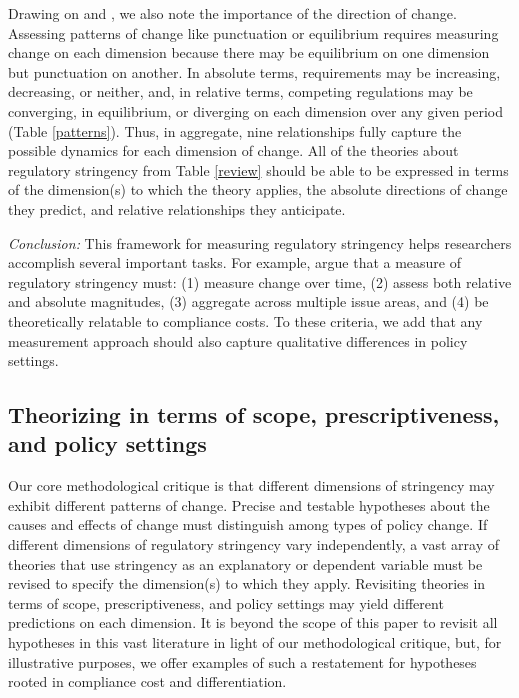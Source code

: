 \documentclass[
      12pt,
            Review ]{article}
\begin{document}
Drawing on \citet{Baumgartner2002} and \citet{Howlett2007}, we also note
the importance of the direction of change. Assessing patterns of change
like punctuation or equilibrium requires measuring change on each
dimension because there may be equilibrium on one dimension but
punctuation on another. In absolute terms, requirements may be
increasing, decreasing, or neither, and, in relative terms, competing
regulations may be converging, in equilibrium, or diverging on each
dimension over any given period (Table \ref{patterns}). Thus, in
aggregate, nine relationships fully capture the possible dynamics for
each dimension of change. All of the theories about regulatory
stringency from Table \ref{review} should be able to be expressed in
terms of the dimension(s) to which the theory applies, the absolute
directions of change they predict, and relative relationships they
anticipate.



\emph{Conclusion:} This framework for measuring regulatory stringency
helps researchers accomplish several important tasks. For example,
\citet{Brunel2016} argue that a measure of regulatory stringency must:
(1) measure change over time, (2) assess both relative and absolute
magnitudes, (3) aggregate across multiple issue areas, and (4) be
theoretically relatable to compliance costs. To these criteria, we add
that any measurement approach should also capture qualitative
differences in policy settings.

\subsection{Theorizing in terms of scope, prescriptiveness, and policy
settings}\label{theorizing-in-terms-of-scope-prescriptiveness-and-policy-settings}

Our core methodological critique is that different dimensions of
stringency may exhibit different patterns of change. Precise and
testable hypotheses about the causes and effects of change must
distinguish among types of policy change. If different dimensions of
regulatory stringency vary independently, a vast array of theories that
use stringency as an explanatory or dependent variable must be revised
to specify the dimension(s) to which they apply. Revisiting theories in
terms of scope, prescriptiveness, and policy settings may yield
different predictions on each dimension. It is beyond the scope of this
paper to revisit all hypotheses in this vast literature in light of our
methodological critique, but, for illustrative purposes, we offer
examples of such a restatement for hypotheses rooted in compliance cost
and differentiation.
\end{document}
